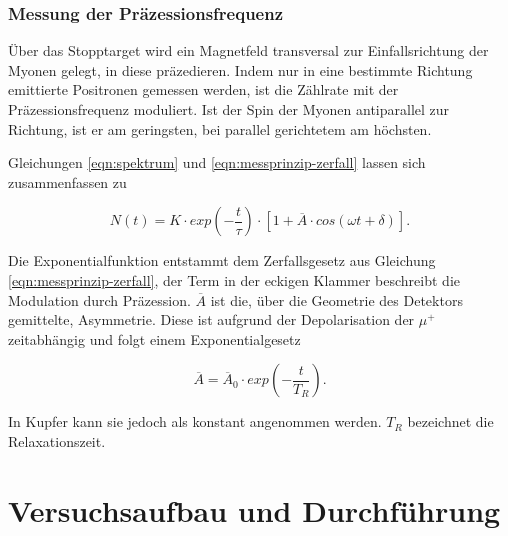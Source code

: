 \documentclass[a4paper,ngerman]{scrartcl}
\begin{document}
\subsubsection*{Messung der Präzessionsfrequenz}


Über das Stopptarget wird ein Magnetfeld transversal zur Einfallsrichtung der Myonen gelegt, in diese präzedieren.
Indem nur in eine bestimmte Richtung emittierte Positronen gemessen werden, ist die Zählrate mit der Präzessionsfrequenz moduliert. Ist der Spin der Myonen antiparallel zur Richtung, ist er am geringsten, bei parallel gerichtetem am höchsten.


Gleichungen \ref{eqn:spektrum} und \ref{eqn:messprinzip-zerfall}
lassen sich zusammenfassen zu

\begin{equation}
N(t) = K \cdot exp(- \frac{t}{\tau}) \cdot \left[ 1 + \overline{A} \cdot cos(\omega t + \delta) \right] .
\end{equation}

Die Exponentialfunktion entstammt dem Zerfallsgesetz aus Gleichung \ref{eqn:messprinzip-zerfall}, der Term in der eckigen Klammer beschreibt die Modulation durch Präzession.
$\overline{A}$ ist die, über die Geometrie des Detektors gemittelte, Asymmetrie. Diese ist aufgrund der Depolarisation der $\mu^{+}$ zeitabhängig und folgt einem Exponentialgesetz

\begin{equation}
\overline{A} = \overline{A}_0 \cdot exp(- \frac{t}{ T_R }) .
\end{equation}

In Kupfer kann sie jedoch als konstant angenommen werden. $T_R$ bezeichnet die Relaxationszeit.
	
\clearpage

\section{Versuchsaufbau und Durchführung}
\end{document}

